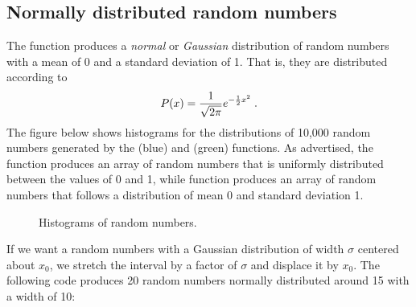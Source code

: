 \documentclass[letterpaper,10pt,english]{sphinxmanual}
\begin{document}
\subsection{Normally distributed random numbers}
\label{chap3/chap3_arrays:normally-distributed-random-numbers}
The function  produces a \emph{normal} or \emph{Gaussian} distribution of  random numbers with a mean of 0 and a standard deviation of 1.  That is, they are distributed according to
\begin{gather}
\begin{split}P(x) = \frac{1}{\sqrt{2\pi}} e^{-\frac{1}{2}x^2} \;.\end{split}\notag
\end{gather}
The figure below shows histograms for the distributions of 10,000 random numbers generated by the  (blue) and  (green) functions.  As advertised, the  function produces an array of random numbers that is uniformly distributed between the values of 0 and 1, while  function produces an array of random numbers that follows a distribution of mean 0 and standard deviation 1.
\begin{figure}[htbp]
\centering
\capstart

\caption{Histograms of random numbers.}\label{chap3/chap3_arrays:fig-randhistos}\end{figure}

If we want a random numbers with a Gaussian distribution of width $\sigma$ centered about $x_0$, we stretch the interval by a factor of $\sigma$ and displace it by $x_0$.  The following code produces 20 random numbers normally distributed around 15 with a width of 10:
\end{document}
